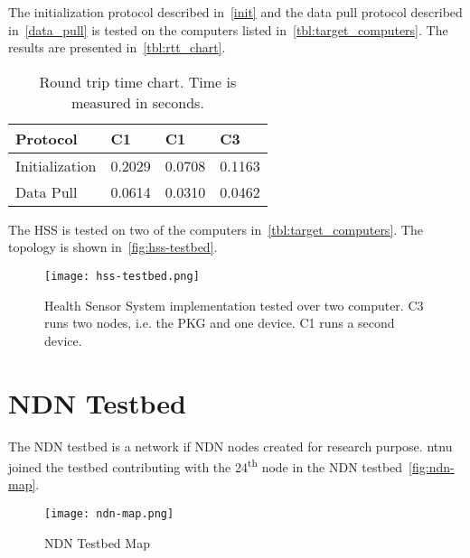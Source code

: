 The initialization protocol described in~\autoref{init} and the data pull protocol described in~\autoref{data_pull} is tested on the computers listed in~\autoref{tbl:target_computers}.
The results are presented in~\autoref{tbl:rtt_chart}.
\begin{table}[h]
  \begin{tabular}[c]{p{}p{}p{}p{}}
  Protocol                                & C1            & C1            & C3            \\ \hline
  Initialization                          & 0.2029        & 0.0708        & 0.1163        \\ %
  Data Pull                               & 0.0614        & 0.0310        & 0.0462        \\ %
  \end{tabular}
  \caption{Round trip time chart. Time is measured in seconds.}
  \label{tbl:rtt_chart}
\end{table}

The \gls{HSS} is tested on two of the computers in~\autoref{tbl:target_computers}.
The topology is shown in~\autoref{fig:hss-testbed}.
\begin{figure}[ht]
  \centering
  \texttt{[image: hss-testbed.png]}
  \caption{Health Sensor System implementation tested over two computer. C3 runs two nodes, i.e. the PKG and one device. C1 runs a second device.}
  \label{fig:hss-testbed}
\end{figure}

\section{NDN Testbed}
The \gls{NDN} testbed is a network if \gls{NDN} nodes created for research purpose. 
\gls{ntnu} joined the testbed contributing with the 24\textsuperscript{th} node in the NDN testbed~\autoref{fig:ndn-map}.

\begin{figure}[ht]
  \centering
  \texttt{[image: ndn-map.png]}
  \caption{NDN Testbed Map}
  \label{fig:ndn-map}
\end{figure}
